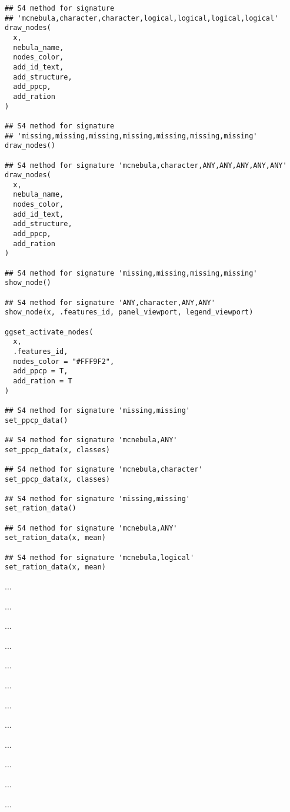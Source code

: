 \documentclass[letterpaper]{book}
\begin{document}
\begin{Usage}
\begin{verbatim}
## S4 method for signature 
## 'mcnebula,character,character,logical,logical,logical,logical'
draw_nodes(
  x,
  nebula_name,
  nodes_color,
  add_id_text,
  add_structure,
  add_ppcp,
  add_ration
)

## S4 method for signature 
## 'missing,missing,missing,missing,missing,missing,missing'
draw_nodes()

## S4 method for signature 'mcnebula,character,ANY,ANY,ANY,ANY,ANY'
draw_nodes(
  x,
  nebula_name,
  nodes_color,
  add_id_text,
  add_structure,
  add_ppcp,
  add_ration
)

## S4 method for signature 'missing,missing,missing,missing'
show_node()

## S4 method for signature 'ANY,character,ANY,ANY'
show_node(x, .features_id, panel_viewport, legend_viewport)

ggset_activate_nodes(
  x,
  .features_id,
  nodes_color = "#FFF9F2",
  add_ppcp = T,
  add_ration = T
)

## S4 method for signature 'missing,missing'
set_ppcp_data()

## S4 method for signature 'mcnebula,ANY'
set_ppcp_data(x, classes)

## S4 method for signature 'mcnebula,character'
set_ppcp_data(x, classes)

## S4 method for signature 'missing,missing'
set_ration_data()

## S4 method for signature 'mcnebula,ANY'
set_ration_data(x, mean)

## S4 method for signature 'mcnebula,logical'
set_ration_data(x, mean)
\end{verbatim}
\end{Usage}
%
\begin{Arguments}
\begin{ldescription}
\item[\code{x}] ...

\item[\code{nebula\_name}] ...

\item[\code{nodes\_color}] ...

\item[\code{add\_id\_text}] ...

\item[\code{add\_structure}] ...

\item[\code{add\_ppcp}] ...

\item[\code{add\_ration}] ...

\item[\code{.features\_id}] ...

\item[\code{panel\_viewport}] ...

\item[\code{legend\_viewport}] ...

\item[\code{classes}] ...

\item[\code{mean}] ...
\end{ldescription}
\end{Arguments}
\end{document}
